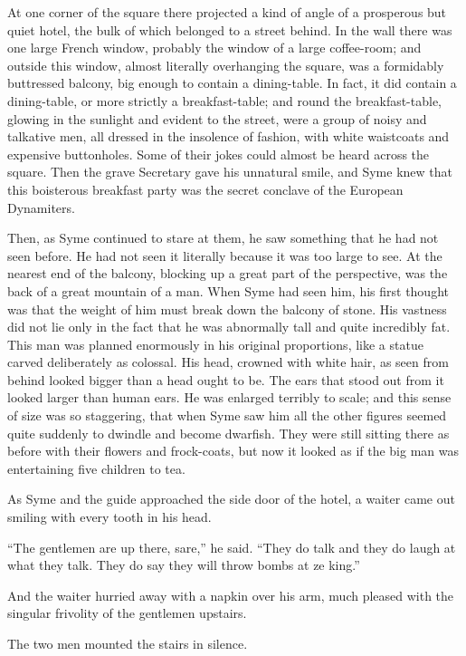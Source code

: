 At one corner of the square there projected a kind of angle of a prosperous but quiet hotel, the bulk of which belonged to a street behind. In the wall there was one large French window, probably the window of a large coffee-room; and outside this window, almost literally overhanging the square, was a formidably buttressed balcony, big enough to contain a dining-table. In fact, it did contain a dining-table, or more strictly a breakfast-table; and round the breakfast-table, glowing in the sunlight and evident to the street, were a group of noisy and talkative men, all dressed in the insolence of fashion, with white waistcoats and expensive buttonholes. Some of their jokes could almost be heard across the square. Then the grave Secretary gave his unnatural smile, and Syme knew that this boisterous breakfast party was the secret conclave of the European Dynamiters.

Then, as Syme continued to stare at them, he saw something that he had not seen before. He had not seen it literally because it was too large to see. At the nearest end of the balcony, blocking up a great part of the perspective, was the back of a great mountain of a man. When Syme had seen him, his first thought was that the weight of him must break down the balcony of stone. His vastness did not lie only in the fact that he was abnormally tall and quite incredibly fat. This man was planned enormously in his original proportions, like a statue carved deliberately as colossal. His head, crowned with white hair, as seen from behind looked bigger than a head ought to be. The ears that stood out from it looked larger than human ears. He was enlarged terribly to scale; and this sense of size was so staggering, that when Syme saw him all the other figures seemed quite suddenly to dwindle and become dwarfish. They were still sitting there as before with their flowers and frock-coats, but now it looked as if the big man was entertaining five children to tea.

As Syme and the guide approached the side door of the hotel, a waiter came out smiling with every tooth in his head.

“The gentlemen are up there, sare,” he said. “They do talk and they do laugh at what they talk. They do say they will throw bombs at ze king.”

And the waiter hurried away with a napkin over his arm, much pleased with the singular frivolity of the gentlemen upstairs.

The two men mounted the stairs in silence.

